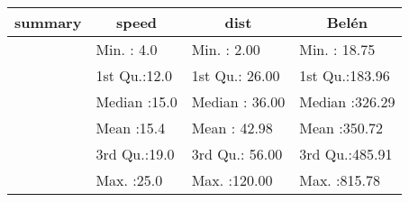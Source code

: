 \begin{table}[!tbp]
\begin{center}
\begin{tabular}{llll}
\hline\hline
\multicolumn{1}{l}{summary}&\multicolumn{1}{c}{    speed}&\multicolumn{1}{c}{     dist}&\multicolumn{1}{c}{    Belén}\tabularnewline
\hline
&Min.   : 4.0  &Min.   :  2.00  &Min.   : 18.75  \tabularnewline
&1st Qu.:12.0  &1st Qu.: 26.00  &1st Qu.:183.96  \tabularnewline
&Median :15.0  &Median : 36.00  &Median :326.29  \tabularnewline
&Mean   :15.4  &Mean   : 42.98  &Mean   :350.72  \tabularnewline
&3rd Qu.:19.0  &3rd Qu.: 56.00  &3rd Qu.:485.91  \tabularnewline
&Max.   :25.0  &Max.   :120.00  &Max.   :815.78  \tabularnewline
\hline
\end{tabular}\end{center}
\end{table}
